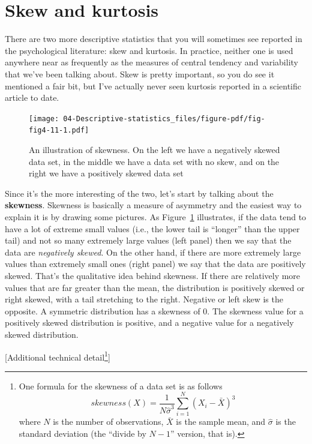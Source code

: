 \documentclass[
  a4paper,
]{book}
\begin{document}
\hypertarget{skew-and-kurtosis}{%
\section{Skew and kurtosis}\label{skew-and-kurtosis}}

There are two more descriptive statistics that you will sometimes see
reported in the psychological literature: skew and kurtosis. In
practice, neither one is used anywhere near as frequently as the
measures of central tendency and variability that we've been talking
about. Skew is pretty important, so you do see it mentioned a fair bit,
but I've actually never seen kurtosis reported in a scientific article
to date.

\begin{figure}

\texttt{[image: 04-Descriptive-statistics\_files/figure-pdf/fig-fig4-11-1.pdf]} \hfill{}

\caption{\label{fig-fig4-11}An illustration of skewness. On the left we
have a negatively skewed data set, in the middle we have a data set with
no skew, and on the right we have a positively skewed data set}

\end{figure}

Since it's the more interesting of the two, let's start by talking about
the \textbf{skewness}. Skewness is basically a measure of asymmetry and
the easiest way to explain it is by drawing some pictures. As
Figure~\ref{fig-fig4-11} illustrates, if the data tend to have a lot of
extreme small values (i.e., the lower tail is ``longer'' than the upper
tail) and not so many extremely large values (left panel) then we say
that the data are \emph{negatively skewed}. On the other hand, if there
are more extremely large values than extremely small ones (right panel)
we say that the data are positively skewed. That's the qualitative idea
behind skewness. If there are relatively more values that are far
greater than the mean, the distribution is positively skewed or right
skewed, with a tail stretching to the right. Negative or left skew is
the opposite. A symmetric distribution has a skewness of 0. The skewness
value for a positively skewed distribution is positive, and a negative
value for a negatively skewed distribution.

{[}Additional technical detail\footnote{One formula for the skewness of
  a data set is as follows
  \[skewness(X)=\frac{1}{N \hat{\sigma}^3} \sum_{i=1}^{N} ( X_i - \bar{X})^3\]
  where \(N\) is the number of observations, \(\bar{X}\) is the sample
  mean, and \(\hat{\sigma}\) is the standard deviation (the ``divide by
  \(N - 1\)'' version, that is).}{]}
\end{document}
